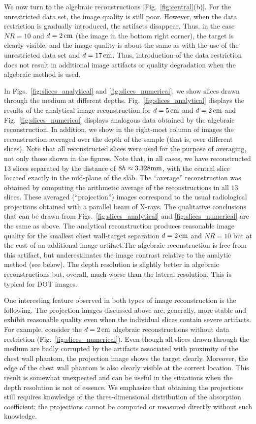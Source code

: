 We now turn to the algebraic reconstructions [Fig.~\ref{fig:central}(b)]. For the unrestricted data set, the image quality is still poor. However, when the data restriction is gradually introduced, the artifacts disappear.  Thus, in the case $NR=10$ and $d=2\,{\rm cm}$ (the image in the bottom right corner), the target is clearly visible, and the image quality is about the same as with the use of the unrestricted data set and $d=17\,{\rm cm}$. Thus, introduction of the data restriction does not result in additional image artifacts or quality degradation when the algebraic method is used.

In Figs.~\ref{fig:slices_analytical} and \ref{fig:slices_numerical}, we show slices drawn through the medium at different depths. Fig.~\ref{fig:slices_analytical} displays the results of the analytical image reconstruction for $d=5\,{\rm cm}$ and $d=2\,{\rm cm}$ and Fig.~\ref{fig:slices_numerical} displays analogous data obtained by the algebraic reconstruction. In addition, we show in the right-most column of images the reconstruction averaged over the depth of the sample (that is, over different slices). Note that all reconstructed slices were used for the purpose of averaging, not only those shown in the figures. Note that, in all cases, we have reconstructed $13$ slices separated by the distance of $8h\approx 3.328{\rm mm}$, with the central slice located exactly in  the mid-plane of the slab. The ``average'' reconstruction was  obtained by computing the arithmetic average of the reconstructions in all $13$ slices. These averaged (``projection'') images correspond to the usual radiological projections obtained with a parallel beam of X-rays. The qualitative conclusions that can be drawn from Figs.~\ref{fig:slices_analytical} and \ref{fig:slices_numerical} are the same as above. The analytical reconstruction produces reasonable image quality for the smallest chest wall-target separation $d=2\,{\rm
  cm}$ and $NR=10$ but at the cost of an additional image artifact.The algebraic reconstruction is free from this artifact, but underestimates the image contrast relative to the analytic method (see below). The depth resolution is slightly better in algebraic reconstructions but, overall, much worse than the lateral resolution. This is typical for DOT images.

One interesting feature observed in both types of image reconstruction is the following. The projection images discussed above are, generally, more stable and exhibit reasonable quality even when the individual slices contain severe artifacts. For example, consider the $d=2\,{\rm cm}$ algebraic reconstructions without data restriction (Fig.~\ref{fig:slices_numerical}). Even though all slices drawn through the medium are badly corrupted by the artifacts associated
with proximity of the chest wall phantom, the projection image shows the target clearly. Moreover, the edge of the chest wall phantom is also clearly visible at the correct location. This result is somewhat unexpected and can be useful in the situations when the depth resolution is not of essence. We emphasize that obtaining the projections still requires knowledge of the three-dimensional distribution of the absorption coefficient; the projections cannot be computed or measured directly without such knowledge.

